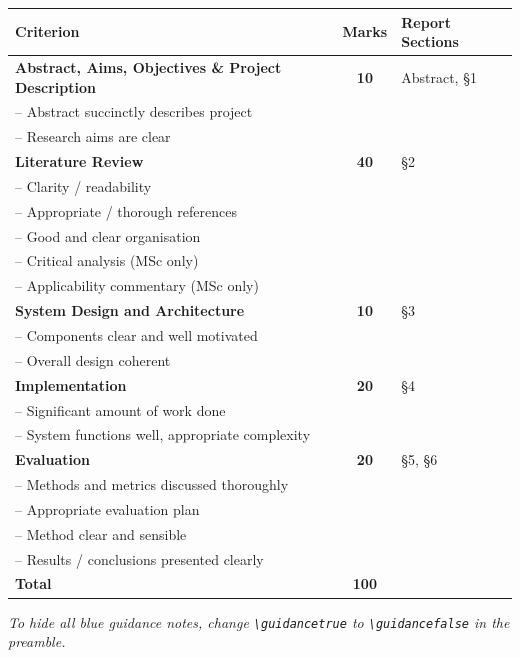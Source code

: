 \documentclass[11pt]{article}
\begin{document}
\begin{table}[H]
\centering
\begin{tabular}{p{8cm}cp{3cm}}
\toprule
\textbf{Criterion} & \textbf{Marks} & \textbf{Report Sections} \\
\midrule
\textbf{Abstract, Aims, Objectives \& Project Description} & \textbf{10} & Abstract, \S1 \\
\quad -- Abstract succinctly describes project & & \\
\quad -- Research aims are clear & & \\
\midrule
\textbf{Literature Review} & \textbf{40} & \S2 \\
\quad -- Clarity / readability & & \\
\quad -- Appropriate / thorough references & & \\
\quad -- Good and clear organisation & & \\
\quad -- Critical analysis (MSc only) & & \\
\quad -- Applicability commentary (MSc only) & & \\
\midrule
\textbf{System Design and Architecture} & \textbf{10} & \S3 \\
\quad -- Components clear and well motivated & & \\
\quad -- Overall design coherent & & \\
\midrule
\textbf{Implementation} & \textbf{20} & \S4 \\
\quad -- Significant amount of work done & & \\
\quad -- System functions well, appropriate complexity & & \\
\midrule
\textbf{Evaluation} & \textbf{20} & \S5, \S6 \\
\quad -- Methods and metrics discussed thoroughly & & \\
\quad -- Appropriate evaluation plan & & \\
\quad -- Method clear and sensible & & \\
\quad -- Results / conclusions presented clearly & & \\
\midrule
\textbf{Total} & \textbf{100} & \\
\bottomrule
\end{tabular}
\end{table}

\noindent\textit{To hide all blue guidance notes, change
\texttt{\textbackslash guidancetrue} to
\texttt{\textbackslash guidancefalse} in the preamble.}
\fi
\end{document}
